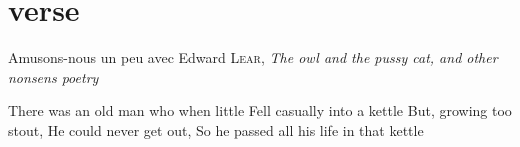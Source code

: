 \documentclass{article}
\begin{document}
\section{verse}

Amusons-nous un peu avec Edward \textsc{Lear}, \emph{The owl and the pussy cat, and other nonsens poetry}

There was an old man who when little
Fell casually into a kettle
	But, growing too stout,
      	He could never get out,
So he passed all his life in that kettle
\end{document}
